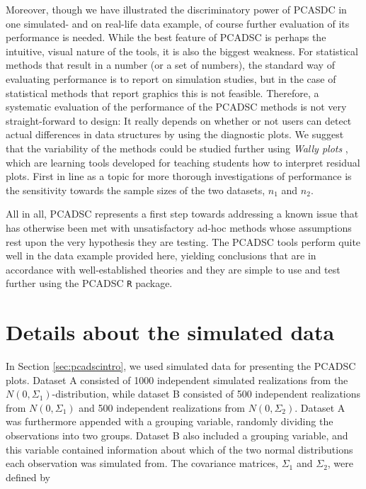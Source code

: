 \documentclass[titlepage,11pt,twoside]{article}
\begin{document}
Moreover, though we have illustrated the discriminatory power of PCASDC in one simulated- and on real-life data example, of course further evaluation of its performance is needed.  
While the best feature of PCADSC is perhaps the intuitive, visual nature of the tools, it is also the biggest weakness. For statistical methods that result in a number (or a set of numbers), the standard way of evaluating performance is to report on simulation studies, but in the case of statistical methods that report graphics this is not feasible. Therefore, a systematic evaluation of the performance of the PCADSC methods is not very straight-forward to design: It really depends on whether or not users can detect actual differences in data structures by using the diagnostic plots. We suggest that the variability of the methods could be studied further using \textit{Wally plots} \citep{Ekstrøm2014}, which are learning tools developed for teaching students how to interpret residual plots. First in line as a topic for more thorough investigations of performance is the sensitivity towards the sample sizes of the two datasets, $n_1$ and $n_2$. 

All in all, PCADSC represents a first step towards addressing a known issue that has otherwise been met with unsatisfactory ad-hoc methods whose assumptions rest upon the very hypothesis they are testing. The PCADSC tools perform quite well in the data example provided here, yielding conclusions that are in accordance with well-established theories and they are simple to use and test further using the PCADSC \texttt{R} package. 






\appendix

\section{Details about the simulated data}
\label{appendix.simData}
In Section \ref{sec:pcadscintro}, we used simulated data for presenting the PCADSC plots. Dataset A consisted of 1000 independent simulated realizations from the $N(0, \Sigma_1)$-distribution, while dataset B consisted of 500 independent realizations from $N(0, \Sigma_1)$ and 500 independent realizations from $N(0, \Sigma_2)$. Dataset A was furthermore appended with a grouping variable, randomly dividing the observations into two groups. Dataset B also included a grouping variable, and this variable contained information about which of the two normal distributions each observation was simulated from. The covariance matrices, $\Sigma_1$ and $\Sigma_2$, were defined by
\end{document}
